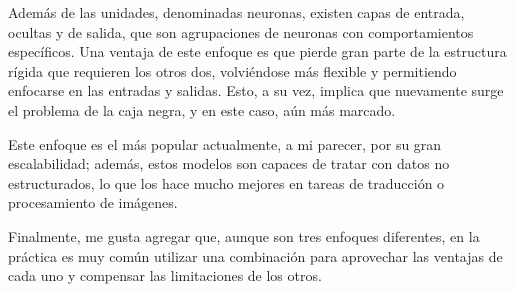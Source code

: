 \begin{itemize}
    Además de las unidades, denominadas neuronas, existen capas de entrada, ocultas y de salida, que son agrupaciones de neuronas con comportamientos específicos. Una ventaja de este enfoque es que pierde gran parte de la estructura rígida que requieren los otros dos, volviéndose más flexible y permitiendo enfocarse en las entradas y salidas. Esto, a su vez, implica que nuevamente surge el problema de la caja negra, y en este caso, aún más marcado. \vspace{.3cm}

    Este enfoque es el más popular actualmente, a mi parecer, por su gran escalabilidad; además, estos modelos son capaces de tratar con datos no estructurados, lo que los hace mucho mejores en tareas de traducción o procesamiento de imágenes. \vspace{.3cm}

    \cite{goodfellow2016deep}
\end{itemize}

Finalmente, me gusta agregar que, aunque son tres enfoques diferentes, en la práctica es muy común utilizar una combinación para aprovechar las ventajas de cada uno y compensar las limitaciones de los otros.
